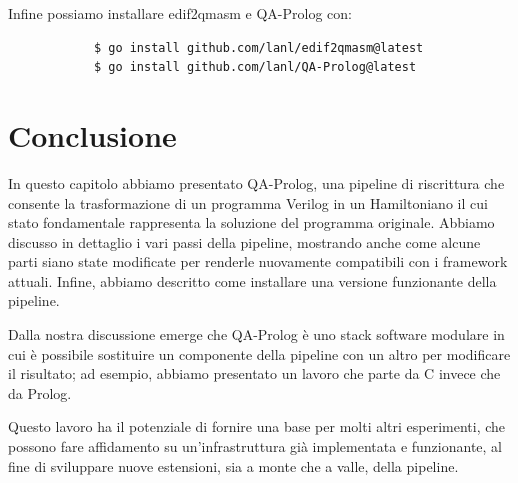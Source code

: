 Infine possiamo installare edif2qmasm e QA-Prolog con:
\begin{center}
	\vspace{-.1cm}
	\begin{minipage}{.7\linewidth}
		\begin{verbatim}
			$ go install github.com/lanl/edif2qmasm@latest
			$ go install github.com/lanl/QA-Prolog@latest
		\end{verbatim}
	\end{minipage}
\end{center}

\section{Conclusione}
In questo capitolo abbiamo presentato QA-Prolog, una pipeline di riscrittura che consente la trasformazione di un programma Verilog in un Hamiltoniano il cui stato fondamentale rappresenta la soluzione del programma originale. Abbiamo discusso in dettaglio i vari passi della pipeline, mostrando anche come alcune parti siano state modificate per renderle nuovamente compatibili con i framework attuali. Infine, abbiamo descritto come installare una versione funzionante della pipeline.

Dalla nostra discussione emerge che QA-Prolog è uno stack software modulare in cui è possibile sostituire un componente della pipeline con un altro per modificare il risultato; ad esempio, abbiamo presentato un lavoro che parte da C invece che da Prolog. 

Questo lavoro ha il potenziale di fornire una base per molti altri esperimenti, che possono fare affidamento su un'infrastruttura già implementata e funzionante, al fine di sviluppare nuove estensioni, sia a monte che a valle, della pipeline.
